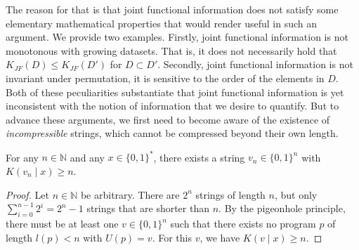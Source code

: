 The reason for that is that joint functional information does not satisfy some elementary mathematical properties that would render useful in such an argument.
We provide two examples.
Firstly, joint functional information is not monotonous with growing datasets.
That is, it does not necessarily hold that $K_{JF}(D)\leq K_{JF}(D')$ for $D\subset D'$.
Secondly, joint functional information is not invariant under permutation, it is sensitive to the order of the elements in $D$.
Both of these peculiarities substantiate that joint functional information is yet inconsistent with the notion of information that we desire to quantify.
But to advance these arguments, we first need to become aware of the existence of \textit{incompressible} strings, which cannot be compressed beyond their own length.
\begin{lemma}
	\label{lemma:incompressible-strings-conditional}
	For any $n\in\mathbb{N}$ and any $x\in\{0,1\}^{*}$, there exists a string $v_n\in\{0,1\}^n$ with $K(v_n\mid x)\geq n$.
	
\end{lemma}
\begin{proof}
	Let $n\in\mathbb{N}$ be arbitrary.
	There are $2^n$ strings of length $n$, but only $\sum_{i=0}^{n-1}2^i=2^{n}-1$ strings that are shorter than $n$. 
	By the pigeonhole principle, there must be at least one $v\in\{0,1\}^n$ such that there exists no program $p$ of length $l(p)<n$ with $U(p)=v$.
	For this $v$, we have $K(v\mid x)\geq n$.
\end{proof}

